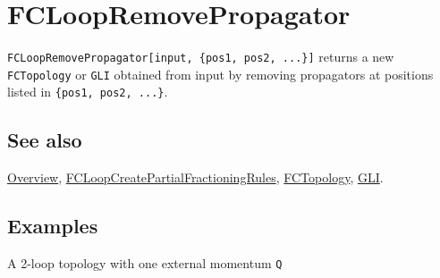 \documentclass[../FeynCalcManual.tex]{subfiles}
\begin{document}
\begin{Shaded}
\begin{Highlighting}[]
 
\end{Highlighting}
\end{Shaded}

\hypertarget{fcloopremovepropagator}{
\section{FCLoopRemovePropagator}\label{fcloopremovepropagator}}

\texttt{FCLoopRemovePropagator[\allowbreak{}input,\ \allowbreak{}\{\allowbreak{}pos1,\ \allowbreak{}pos2,\ \allowbreak{}...\}]}
returns a new \texttt{FCTopology} or \texttt{GLI} obtained from input by
removing propagators at positions listed in
\texttt{\{\allowbreak{}pos1,\ \allowbreak{}pos2,\ \allowbreak{}...\}}.

\subsection{See also}

\hyperlink{toc}{Overview},
\hyperlink{fcloopcreatepartialfractioningrules}{FCLoopCreatePartialFractioningRules},
\hyperlink{fctopology}{FCTopology}, \hyperlink{gli}{GLI}.

\subsection{Examples}

A 2-loop topology with one external momentum \texttt{Q}

\begin{Shaded}
\begin{Highlighting}[]
\ExtensionTok{=}\OperatorTok{[}\OperatorTok{,} \OperatorTok{\{}\OperatorTok{[}\OperatorTok{],}\OperatorTok{[}\OperatorTok{],}\OperatorTok{[} \SpecialCharTok{{-}}\SpecialCharTok{{-}}\OperatorTok{],}\OperatorTok{[} \SpecialCharTok{{-}}\OperatorTok{],}\OperatorTok{[} \SpecialCharTok{{-}}\OperatorTok{]\},} \OperatorTok{\{}\OperatorTok{,}\OperatorTok{\},} \OperatorTok{\{}\OperatorTok{\},} \OperatorTok{\{}
    \OperatorTok{[}\OperatorTok{[}\OperatorTok{]]} \OtherTok{{-}\textgreater{}}\OperatorTok{\},} \OperatorTok{\{\}]}
\end{Highlighting}
\end{Shaded}
\end{document}
